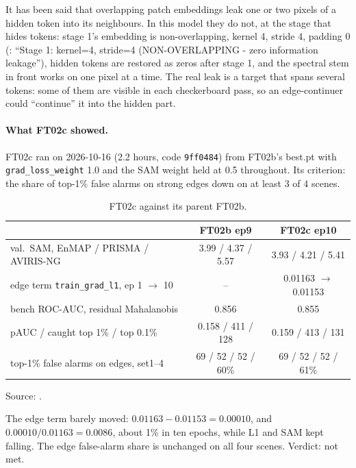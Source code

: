\begin{sourcenote}
It has been said that overlapping patch embeddings leak one or two pixels of a hidden token into its neighbours. In
this model they do not, at the stage that hides tokens: stage 1's embedding is non-overlapping, kernel 4, stride 4,
padding 0 (: ``Stage 1: kernel=4, stride=4
(NON-OVERLAPPING - zero information leakage''), hidden tokens are restored as zeros after stage 1, and the spectral
stem in front works on one pixel at a time. The real leak is a target that spans several tokens: some of them are
visible in each checkerboard pass, so an edge-continuer could ``continue'' it into the hidden part.
\end{sourcenote}

\paragraph{What FT02c showed.} FT02c ran on 2026-10-16 (2.2 hours, code \texttt{9ff0484}) from FT02b's best.pt with
\texttt{grad\_loss\_weight} 1.0 and the SAM weight held at 0.5 throughout. Its criterion: the share of top-1\% false
alarms on strong edges down on at least 3 of 4 scenes.

\begin{table}[htbp]
\centering
\caption{FT02c against its parent FT02b.}
\label{tab:ftruns:ft02c}
\small
\begin{tabular}{lcc}
\toprule
 & FT02b ep9 & FT02c ep10 \\
\midrule
val.\ SAM, EnMAP / PRISMA / AVIRIS-NG & 3.99 / 4.37 / 5.57 & 3.93 / 4.21 / 5.41 \\
edge term \texttt{train\_grad\_l1}, ep 1 $\to$ 10 & -- & 0.01163 $\to$ 0.01153 \\
bench ROC-AUC, residual Mahalanobis & 0.856 & 0.855 \\
pAUC / caught top 1\% / top 0.1\% & 0.158 / 411 / 128 & 0.159 / 413 / 131 \\
top-1\% false alarms on edges, set1--4 & 69 / 52 / 52 / 60\% & 69 / 52 / 52 / 61\% \\
\bottomrule
\end{tabular}

\smallskip
{\footnotesize Source: .}
\end{table}

The edge term barely moved: $0.01163 - 0.01153 = 0.00010$, and $0.00010 / 0.01163 = 0.0086$, about 1\% in ten
epochs, while L1 and SAM kept falling. The edge false-alarm share is unchanged on all four scenes. Verdict: not met.

